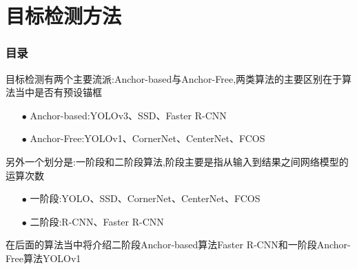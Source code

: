 \section{目标检测方法}

\begin{frame}[allowframebreaks]
    \frametitle{\textsc{目录}} \vspace{-0.3cm}
    \begin{spacing}{0.0}
    \end{spacing}   %
\end{frame}

\begin{frame}
    目标检测有两个主要流派:Anchor-based与Anchor-Free,两类算法的主要区别在于算法当中是否有预设锚框\\
    \begin{itemize}
        \item[$ \bullet $] Anchor-based:YOLOv3、SSD、Faster \;R-CNN
        \item[$ \bullet $] Anchor-Free:YOLOv1、CornerNet、CenterNet、FCOS
    \end{itemize}

    \vspace{1em}
    另外一个划分是:一阶段和二阶段算法,阶段主要是指从输入到结果之间网络模型的运算次数\\
    \begin{itemize}
        \item[$ \bullet $] 一阶段:YOLO、SSD、CornerNet、CenterNet、FCOS
        \item[$ \bullet $] 二阶段:R-CNN、Faster \;R-CNN
    \end{itemize}

    \vspace{1em}
    在后面的算法当中将介绍二阶段Anchor-based算法Faster\; R-CNN和一阶段Anchor-Free算法YOLOv1\\

\end{frame}


